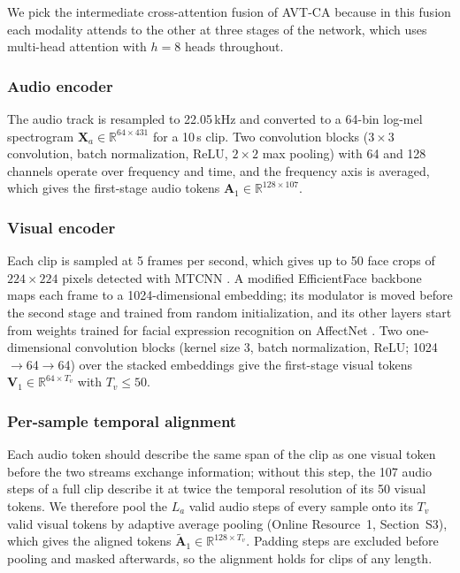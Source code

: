 \documentclass[pdflatex,iicol,sn-basic]{sn-jnl}
\begin{document}
We pick the intermediate cross-attention fusion of AVT-CA \citep{venkatraman2025avtca} because in this fusion each modality attends to the other at three stages of the network, which uses multi-head attention with $h = 8$ heads throughout.

\subsubsection{Audio encoder}\label{sec:audio}

The audio track is resampled to 22.05\,kHz and converted to a 64-bin log-mel spectrogram $\mathbf{X}_a \in \mathbb{R}^{64 \times 431}$ for a 10\,s clip. Two convolution blocks ($3 \times 3$ convolution, batch normalization, ReLU, $2 \times 2$ max pooling) with 64 and 128 channels operate over frequency and time, and the frequency axis is averaged, which gives the first-stage audio tokens $\mathbf{A}_1 \in \mathbb{R}^{128 \times 107}$.

\subsubsection{Visual encoder}\label{sec:visual}

Each clip is sampled at 5 frames per second, which gives up to 50 face crops of $224 \times 224$ pixels detected with MTCNN \citep{zhang2016mtcnn}. A modified EfficientFace backbone \citep{zhao2021efficientface} maps each frame to a 1024-dimensional embedding; its modulator is moved before the second stage and trained from random initialization, and its other layers start from weights trained for facial expression recognition on AffectNet \citep{mollahosseini2019affectnet}. Two one-dimensional convolution blocks (kernel size 3, batch normalization, ReLU; 1024$\to$64$\to$64) over the stacked embeddings give the first-stage visual tokens $\mathbf{V}_1 \in \mathbb{R}^{64 \times T_v}$ with $T_v \le 50$.

\subsubsection{Per-sample temporal alignment}\label{sec:align}

Each audio token should describe the same span of the clip as one visual token before the two streams exchange information; without this step, the 107 audio steps of a full clip describe it at twice the temporal resolution of its 50 visual tokens. We therefore pool the $L_a$ valid audio steps of every sample onto its $T_v$ valid visual tokens by adaptive average pooling (Online Resource~1, Section~S3), which gives the aligned tokens $\tilde{\mathbf{A}}_1 \in \mathbb{R}^{128 \times T_v}$. Padding steps are excluded before pooling and masked afterwards, so the alignment holds for clips of any length.
\end{document}

